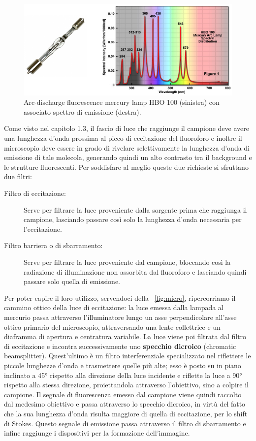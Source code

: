 \begin{figure}
 \centering
 \includegraphics[scale=.48]{img/CAP2lampadaquarzo.png}
 \caption{\small{Arc-discharge fluorescence mercury lamp HBO 100 (sinistra) con associato spettro di emissione (destra).}}
 \label{fig:lamp}
\end{figure}

Come visto nel capitolo 1.3, il fascio di luce che raggiunge il campione deve avere una lunghezza d'onda prossima al picco di eccitazione del fluoroforo e inoltre il microscopio deve essere in grado di rivelare selettivamente la lunghezza d'onda di emissione di tale molecola, generando quindi un alto contrasto tra il background e le strutture fluorescenti.
Per soddisfare al meglio queste due richieste si sfruttano due filtri:
\begin{description}
\item[Filtro di eccitazione:]
Serve per filtrare la luce proveniente dalla sorgente prima che raggiunga il campione, lasciando passare così solo la lunghezza d'onda necessaria per l'eccitazione.
\item[Filtro barriera o di sbarramento:]
Serve per filtrare la luce proveniente dal campione, bloccando così la radiazione di illuminazione non assorbita dal fluoroforo e lasciando quindi passare solo quella di emissione. 
\end{description}
Per poter capire il loro utilizzo, servendoci della \figurename~\ref{fig:micro}, ripercorriamo il cammino ottico della luce di eccitazione: la luce emessa dalla lampada al mercurio passa attraverso l'illuminatore lungo un asse perpendicolare all'asse ottico primario del microscopio, attraversando una lente collettrice e un diaframma di apertura e centratura variabile. 
La luce viene poi filtrata dal filtro di eccitazione e incontra successivamente uno \textbf{specchio dicroico} (chromatic beamsplitter). 
Quest'ultimo è un filtro interferenziale specializzato nel riflettere le piccole lunghezze d'onda e trasmettere quelle più alte; esso è posto su in piano inclinato a 45° rispetto alla direzione della luce incidente e riflette la luce a 90° rispetto alla stessa direzione, proiettandola attraverso l'obiettivo, sino a colpire il campione. 
Il segnale di fluorescenza emesso dal campione viene quindi raccolto dal medesimo obiettivo e passa attraverso lo specchio dicroico, in virtù del fatto che la sua lunghezza d'onda risulta maggiore di quella di eccitazione, per lo shift di Stokes. 
Questo segnale di emissione passa attraverso il filtro di sbarramento e infine raggiunge i dispositivi per la formazione dell'immagine.

